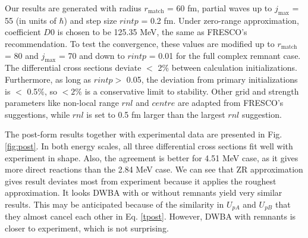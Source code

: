 Our results are generated with radius $r_{\mathrm{match}}$ = 60 fm, partial waves up to $j_{\max}$ = 55 (in units of $\hbar$) and step size $rintp$ = 0.2 fm. 
Under zero-range approximation, coefficient $D0$ is chosen to be 125.35 MeV, the same as FRESCO's recommendation. 
To test the convergence, these values are modified up to $r_{\mathrm{match}}$ = 80 and $j_{\max}$ = 70 and down to $rintp$ = 0.01 for the full complex remnant case.
 The differential cross sections deviate $<$ 2$\%$  between calculation initializations. 
 Furthermore, as long as $rintp >$ 0.05, the deviation from primary initializations is $<$ 0.5$\%$, so $< 2\%$ is a conservative limit to stability. 
 Other grid and strength parameters like non-local range $rnl$ and $centre$ are adapted from FRESCO's suggestions,
while $rnl$ is set to 0.5 fm larger than the largest $rnl$ suggestion.

The post-form results together with experimental data \cite{PhysRev.101.209} are presented in Fig. \ref{fig:post}.
In both energy scales, all three differential cross sections fit well with experiment in shape. 
Also, the agreement is better for 4.51 MeV case, as it gives more direct reactions than the 2.84 MeV case.
We can see that ZR approximation gives result deviates most from experiment because it applies the roughest approximation.
It looks DWBA with or without remnants yield very similar results.
This may be anticipated because of the similarity in $U_{pA}$ and $U_{pB}$ that they almost cancel each other in Eq. \ref{tpost}.
However, DWBA with remnants is closer to experiment, which is not surprising. 